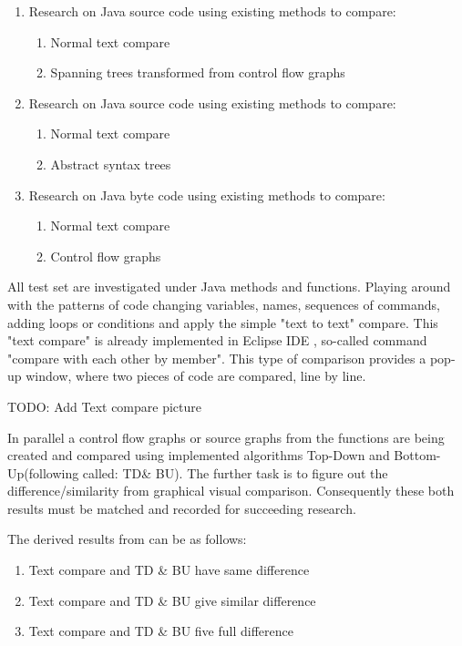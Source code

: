 \documentclass{report}
\begin{document}
\begin{enumerate}
  \item Research on Java source code using existing methods to compare:
  	\begin{enumerate}
   	 	\item Normal text compare
   		 \item Spanning trees transformed from control flow graphs
	 \end{enumerate}	
	 
  \item Research on Java source code using existing methods to compare:
  \begin{enumerate}
    \item Normal text compare 
    \item Abstract syntax trees
  \end{enumerate}
  
  \item Research on Java byte code using existing methods to compare:
  \begin{enumerate}
    \item Normal text compare 
    \item Control flow graphs
  \end{enumerate}
\end{enumerate}

All test set are investigated under Java methods and functions. Playing around with the patterns of code changing variables, names, sequences of commands, adding loops or conditions and apply the simple "text to text" compare. This "text compare" is already implemented in Eclipse IDE \cite{eclipse_site}, so-called command "compare with each other by member". This type of comparison provides a pop-up window, where two pieces of code are compared, line by line.

TODO: Add Text compare picture

In parallel a control flow graphs or source graphs from the functions are being created and compared using implemented algorithms Top-Down and Bottom-Up(following called: TD\& BU). The further task is to figure out the difference/similarity from graphical visual comparison. Consequently these both results must be matched and recorded for succeeding research.

The derived results from can be as follows: 
\begin{enumerate}
  \item Text compare and TD \& BU have same difference
  \item Text compare and TD \& BU give similar difference
  \item Text compare and TD \& BU five full difference
\end{enumerate}
\end{document}
